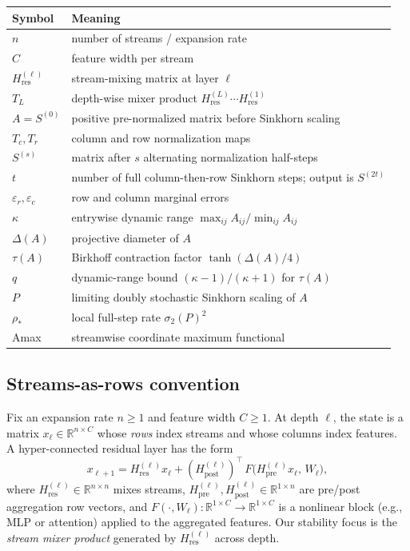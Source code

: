 \documentclass[11pt]{article}
\numberwithin{equation}{section}
\theoremstyle{plain}
\theoremstyle{definition}
\theoremstyle{remark}
\newcommand{\R}{\mathbb{R}}
\newcommand{\Hres}{H_{\mathrm{res}}}
\newcommand{\Hpre}{H_{\mathrm{pre}}}
\newcommand{\Hpost}{H_{\mathrm{post}}}
\newcommand{\Amax}{\textsf{Amax}\,}
\begin{document}
\begin{center}
\small
\begin{tabular}{ll}
\toprule
Symbol & Meaning \\
\midrule
\(n\) & number of streams / expansion rate \\
\(C\) & feature width per stream \\
\(\Hres^{(\ell)}\) & stream-mixing matrix at layer \(\ell\) \\
\(T_L\) & depth-wise mixer product
\(\Hres^{(L)}\cdots \Hres^{(1)}\) \\
\(A=S^{(0)}\) & positive pre-normalized matrix before Sinkhorn scaling \\
\(T_c,T_r\) & column and row normalization maps \\
\(S^{(s)}\) & matrix after \(s\) alternating normalization half-steps \\
\(t\) & number of full column-then-row Sinkhorn steps; output is \(S^{(2t)}\) \\
\(\varepsilon_r,\varepsilon_c\) & row and column marginal errors \\
\(\kappa\) & entrywise dynamic range
\(\max_{ij}A_{ij}/\min_{ij}A_{ij}\) \\
\(\Delta(A)\) & projective diameter of \(A\) \\
\(\tau(A)\) & Birkhoff contraction factor \(\tanh(\Delta(A)/4)\) \\
\(q\) & dynamic-range bound \((\kappa-1)/(\kappa+1)\) for \(\tau(A)\) \\
\(P\) & limiting doubly stochastic Sinkhorn scaling of \(A\) \\
\(\rho_*\) & local full-step rate \(\sigma_2(P)^2\) \\
\Amax & streamwise coordinate maximum functional \\
\bottomrule
\end{tabular}
\end{center}

\subsection{Streams-as-rows convention}
Fix an expansion rate $n\ge 1$ and feature width $C\ge 1$. At depth $\ell$, the state is a matrix
$x_\ell\in\R^{n\times C}$ whose \emph{rows} index streams and whose columns index features. A hyper-connected
residual layer has the form
\begin{equation}\label{eq:mhc-layer}
x_{\ell+1}
=
\Hres^{(\ell)} x_\ell
+
(\Hpost^{(\ell)})^\top\,F\big(\Hpre^{(\ell)}x_\ell,\,W_\ell\big),
\end{equation}
where $\Hres^{(\ell)}\in\R^{n\times n}$ mixes streams, $\Hpre^{(\ell)},\Hpost^{(\ell)}\in\R^{1\times n}$ are
pre/post aggregation row vectors, and $F(\cdot,W_\ell):\R^{1\times C}\to\R^{1\times C}$ is a nonlinear block
(e.g., MLP or attention) applied to the aggregated features. Our stability focus is the \emph{stream mixer product}
generated by $\Hres^{(\ell)}$ across depth.
\end{document}
